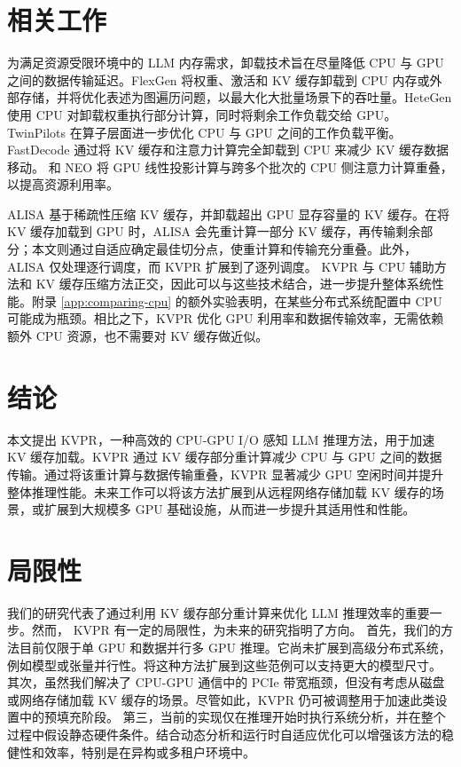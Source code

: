 \documentclass[11pt]{article}
\newcommand{\paperName}{KVPR}
\begin{document}
\section{相关工作}

为满足资源受限环境中的 LLM 内存需求，卸载技术旨在尽量降低 CPU 与 GPU 之间的数据传输延迟。FlexGen \cite{sheng2023flexgen} 将权重、激活和 KV 缓存卸载到 CPU 内存或外部存储，并将优化表述为图遍历问题，以最大化大批量场景下的吞吐量。HeteGen \cite{zhao2024hetegen} 使用 CPU 对卸载权重执行部分计算，同时将剩余工作负载交给 GPU。TwinPilots \cite{yu2024twinpilots} 在算子层面进一步优化 CPU 与 GPU 之间的工作负载平衡。 
FastDecode \cite{he2024fastdecode} 通过将 KV 缓存和注意力计算完全卸载到 CPU 来减少 KV 缓存数据移动。 
\citeauthor{park2024improving} 和 NEO \cite{jiang2024neo} 将 GPU 线性投影计算与跨多个批次的 CPU 侧注意力计算重叠，以提高资源利用率。

ALISA \cite{zhao2024alisa} 基于稀疏性压缩 KV 缓存，并卸载超出 GPU 显存容量的 KV 缓存。在将 KV 缓存加载到 GPU 时，ALISA 会先重计算一部分 KV 缓存，再传输剩余部分；本文则通过自适应确定最佳切分点，使重计算和传输充分重叠。此外，ALISA 仅处理逐行调度，而 {\paperName} 扩展到了逐列调度。
{\paperName} 与 CPU 辅助方法和 KV 缓存压缩方法正交，因此可以与这些技术结合，进一步提升整体系统性能。附录 \ref{app:comparing-cpu} 的额外实验表明，在某些分布式系统配置中 CPU 可能成为瓶颈。相比之下，{\paperName} 优化 GPU 利用率和数据传输效率，无需依赖额外 CPU 资源，也不需要对 KV 缓存做近似。



\section{结论}

本文提出 \paperName，一种高效的 CPU-GPU I/O 感知 LLM 推理方法，用于加速 KV 缓存加载。{\paperName} 通过 KV 缓存部分重计算减少 CPU 与 GPU 之间的数据传输。通过将该重计算与数据传输重叠，{\paperName} 显著减少 GPU 空闲时间并提升整体推理性能。未来工作可以将该方法扩展到从远程网络存储加载 KV 缓存的场景，或扩展到大规模多 GPU 基础设施，从而进一步提升其适用性和性能。

\section{局限性}
我们的研究代表了通过利用 KV 缓存部分重计算来优化 LLM 推理效率的重要一步。然而， {\paperName} 有一定的局限性，为未来的研究指明了方向。
首先，我们的方法目前仅限于单 GPU 和数据并行多 GPU 推理。它尚未扩展到高级分布式系统，例如模型或张量并行性。将这种方法扩展到这些范例可以支持更大的模型尺寸。
其次，虽然我们解决了 CPU-GPU 通信中的 PCIe 带宽瓶颈，但没有考虑从磁盘或网络存储加载 KV 缓存的场景。尽管如此，{\paperName} 仍可被调整用于加速此类设置中的预填充阶段。
第三，当前的实现仅在推理开始时执行系统分析，并在整个过程中假设静态硬件条件。结合动态分析和运行时自适应优化可以增强该方法的稳健性和效率，特别是在异构或多租户环境中。
\end{document}
